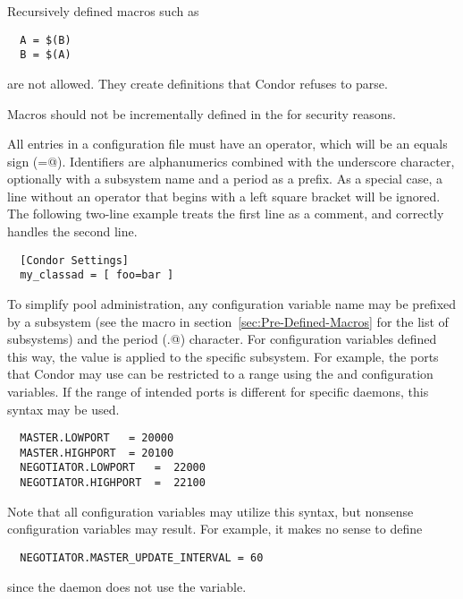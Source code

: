 Recursively defined macros such as
\begin{verbatim}
  A = $(B)
  B = $(A)
\end{verbatim}
are not allowed.
They create definitions that Condor refuses to parse. 

\Note Macros should not be incrementally defined in the
 for security reasons.


All entries in a configuration file must have an operator,
which will be an equals sign (\verb@=@).
Identifiers are alphanumerics combined with the underscore character,
optionally with a subsystem name and a period as a prefix.
As a special case,
a line without an operator that begins with a left square bracket
will be ignored.
The following two-line example treats the first line as a comment,
and correctly handles the second line.
\begin{verbatim}
  [Condor Settings]
  my_classad = [ foo=bar ]
\end{verbatim}

To simplify pool administration,
any configuration variable name may be prefixed by
a subsystem 
(see the  macro in 
section~\ref{sec:Pre-Defined-Macros}
for the list of subsystems)
and the period (\verb@.@) character.
For configuration variables defined this way,
the value is applied to the specific subsystem.
For example,
the ports that Condor may use can be restricted to a range 
using the  and  configuration
variables.
If the range of intended ports is different for specific
daemons, this syntax may be used.
\begin{verbatim}
  MASTER.LOWPORT   = 20000
  MASTER.HIGHPORT  = 20100
  NEGOTIATOR.LOWPORT   =  22000 
  NEGOTIATOR.HIGHPORT  =  22100
\end{verbatim}

Note that all configuration variables may utilize this syntax,
but nonsense configuration variables may result.
For example, it makes no sense to define
\begin{verbatim}
  NEGOTIATOR.MASTER_UPDATE_INTERVAL = 60
\end{verbatim}
since the  daemon does not use the
 variable.

